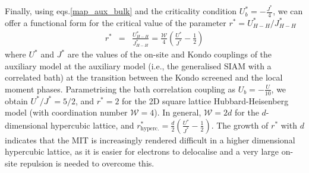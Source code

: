 \documentclass{report}
\numberwithin{equation}{section}
\begin{document}
\begin{itemize}
Finally, using eqs.\eqref{map_aux_bulk} and the criticality condition $U_{b}^{*}=-\frac{J^{*}}{4}$, we can offer a functional form for the critical value of the parameter $r^{*} = U_{H-H}^{*}/J_{H-H}^{*}$
\begin{eqnarray}
	r^{*} &=& \frac{U_{H-H}^{*}}{J_{H-H}^{*}} = \frac{\mathcal{W}}{4}\left(\frac{U^{*}}{J^{*}} - \frac{1}{2}\right)
\end{eqnarray}
where $U^{*}$ and $J^{*}$ are the values of the on-site and Kondo couplings of the auxiliary model at the auxiliary model (i.e., the generalised SIAM with a correlated bath) at the transition between the Kondo screened and the local moment phases. Parametrising the bath correlation coupling as $U_{b}=-\frac{U}{10}$, we obtain $U^{*}/J^{*}=5/2$, and $r^{*} = 2$ for the 2D square lattice Hubbard-Heisenberg model (with coordination number $\mathcal{W}=4$). In general, $\mathcal{W}=2d$ for the $d$-dimensional hypercubic lattice, and 
$r^{*}_\text{hyperc.} = \frac{d}{2}\left(\frac{U^{*}}{J^{*}} - \frac{1}{2}\right)$. The growth of $r^{*}$ with $d$ indicates that the MIT is increasingly rendered difficult in a higher dimensional hypercubic lattice, as it is easier for electrons to delocalise and a very large on-site repulsion is needed to overcome this.
\end{itemize}
\end{document}
